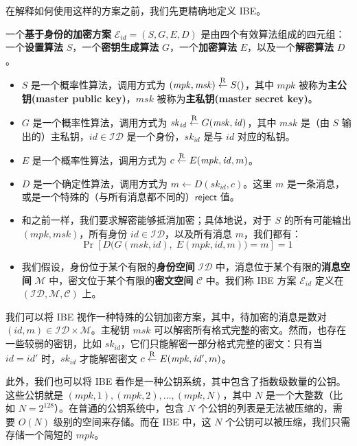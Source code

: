 在解释如何使用这样的方案之前，我们先更精确地定义 IBE。

\begin{definition}\label{def:15-7}
一个\textbf{基于身份的加密方案} $\mathcal{E}_\mathit{id}=(S,G,E,D)$ 是由四个有效算法组成的四元组：一个\textbf{设置算法} $S$，一个\textbf{密钥生成算法} $G$，一个\textbf{加密算法} $E$，以及一个\textbf{解密算法} $D$。
\begin{itemize}
	\item $S$ 是一个概率性算法，调用方式为 $(\mathit{mpk},\mathit{msk})\overset{\rm R}\leftarrow S()$，其中 $\mathit{mpk}$ 被称为\textbf{主公钥(master public key)}，$\mathit{msk}$ 被称为\textbf{主私钥(master secret key)}。
	\item $G$ 是一个概率性算法，调用方式为 $\mathit{sk}_\mathit{id}\overset{\rm R}\leftarrow G(\mathit{msk},\mathit{id})$，其中 $\mathit{msk}$ 是（由 $S$ 输出的）主私钥，$\mathit{id}\in\mathcal{ID}$ 是一个身份，$\mathit{sk}_\mathit{id}$ 是与 $\mathit{id}$ 对应的私钥。
	\item $E$ 是一个概率性算法，调用方式为 $c\overset{\rm R}\leftarrow E(\mathit{mpk},\mathit{id},m)$。
	\item $D$ 是一个确定性算法，调用方式为 $m\leftarrow D(\mathit{sk}_\mathit{id},c)$。这里 $m$ 是一条消息，或是一个特殊的（与所有消息都不同的）$\mathsf{reject}$ 值。
	\item 和之前一样，我们要求解密能够抵消加密；具体地说，对于 $S$ 的所有可能输出 $(\mathit{mpk},\mathit{msk})$，所有身份 $\mathit{id}\in\mathcal{ID}$，以及所有消息 $m$，我们都有：
	\[
	\Pr\left[D\big(G(\mathit{msk},\mathit{id}),\;E(\mathit{mpk},\mathit{id},m)\big)=m\right]=1
	\]
	\item 我们假设，身份位于某个有限的\textbf{身份空间} $\mathcal{ID}$ 中，消息位于某个有限的\textbf{消息空间} $\mathcal{M}$ 中，密文位于某个有限的\textbf{密文空间} $\mathcal{C}$ 中。我们称 IBE 方案 $\mathcal{E}_\mathit{id}$ 定义在 $(\mathcal{ID},\mathcal{M},\mathcal{C})$ 上。
\end{itemize}
\end{definition}

我们可以将 IBE 视作一种特殊的公钥加密方案，其中，待加密的消息是数对 $(\mathit{id},m)\in\mathcal{ID}\times\mathcal{M}$。主秘钥 $\mathit{msk}$ 可以解密所有格式完整的密文。然而，也存在一些较弱的密钥，比如 $\mathit{sk}_\mathit{id}$，它们只能解密一部分格式完整的密文：只有当 $\mathit{id}=\mathit{id'}$ 时，$\mathit{sk}_\mathit{id}$ 才能解密密文 $c\overset{\rm R}\leftarrow E(\mathit{mpk},\mathit{id'},m)$。

此外，我们也可以将 IBE 看作是一种公钥系统，其中包含了指数级数量的公钥。这些公钥就是 $(\mathit{mpk},1), (\mathit{mpk},2),\dots,(\mathit{mpk},N)$，其中 $N$ 是一个大整数（比如 $N=2^{128}$）。在普通的公钥系统中，包含 $N$ 个公钥的列表是无法被压缩的，需要 $O(N)$ 级别的空间来存储。而在 IBE 中，这 $N$ 个公钥可以被压缩，我们只需存储一个简短的 $\mathit{mpk}$。

